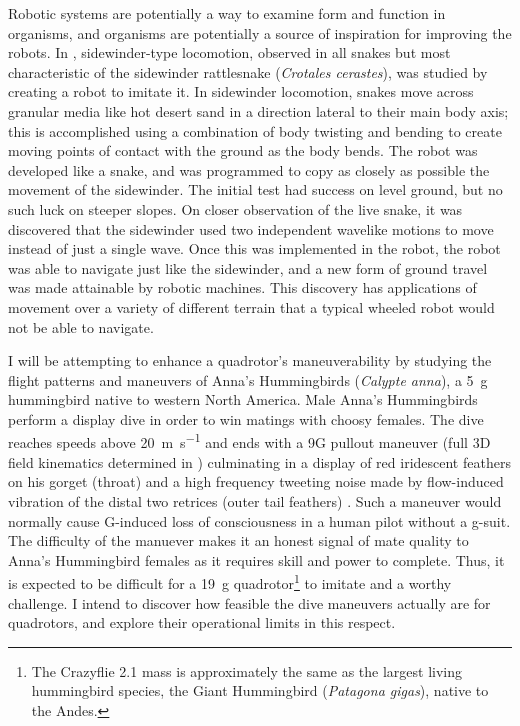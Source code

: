 \documentclass[onecolumn,10pt]{IEEEtran}
\newcommand{\Calypteanna}{\emph{Calypte anna}}
\begin{document}
Robotic systems are potentially a way to examine form and function in organisms, and organisms are potentially a source of inspiration for improving the robots.  In \cite{feltman2014creepy}, sidewinder-type locomotion, observed in all snakes but most characteristic of the sidewinder rattlesnake (\emph{Crotales cerastes}), was studied by creating a robot to imitate it. In sidewinder locomotion, snakes move across granular media like hot desert sand in a direction lateral to their main body axis; this is accomplished using a combination of body twisting and bending to create moving points of contact with the ground as the body bends.  The robot was developed like a snake, and was programmed to copy as closely as possible the movement of the sidewinder. The initial test had success on level ground, but no such luck on steeper slopes. On closer observation of the live snake, it was discovered that the sidewinder used two independent wavelike motions to move instead of just a single wave. Once this was implemented in the robot, the robot was able to navigate just like the sidewinder, and a new form of ground travel was made attainable by robotic machines. This discovery has applications of movement over a variety of different terrain that a typical wheeled robot would not be able to navigate.

I will be attempting to enhance a quadrotor’s maneuverability by studying the flight patterns and maneuvers of Anna’s Hummingbirds (\Calypteanna), a \SI{5}{\gram} hummingbird native to western North America. Male Anna's Hummingbirds perform a display dive in order to win matings with choosy females. The dive reaches speeds above \SI{20}{\meter\per\second} \cite{larimer1995accelerational} and ends with a 9G pullout maneuver (full 3D field kinematics determined in \cite{clark2009courtship}) culminating in a display of red iridescent feathers on his gorget (throat) and a high frequency tweeting noise made by flow-induced vibration of the distal two retrices (outer tail feathers) \cite{clark2008annas}. Such a maneuver would normally cause G-induced loss of consciousness in a human pilot without a g-suit.  The difficulty of the manuever makes it an honest signal \cite{zahavi1975mate} of mate quality to Anna's Hummingbird females as it requires skill and power to complete. Thus, it is expected to be difficult for a \SI{19}{\gram} quadrotor\footnote{The Crazyflie 2.1 mass is approximately the same as the largest living hummingbird species, the Giant Hummingbird (\emph{Patagona gigas}), native to the Andes.}  to imitate and a worthy challenge. I intend to discover how feasible the dive maneuvers actually are for quadrotors, and explore their operational limits in this respect. 
\end{document}
